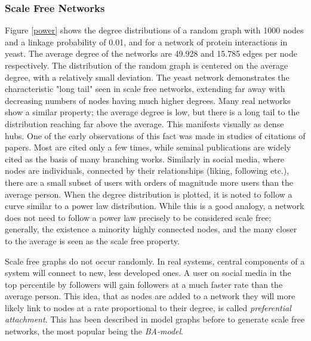 \subsubsection{Scale Free Networks}

Figure \ref{power} shows the degree distributions of a random graph with 1000 nodes and a linkage probability of 0.01, and for a network of protein interactions in yeast. The average degree of the networks are 49.928 and 15.785 edges per node respectively. The distribution of the random graph is centered on the average degree, with a relatively small deviation. The yeast network demonstrates the characteristic "long tail" seen in scale free networks, extending far away with decreasing numbers of nodes having much higher degrees. Many real networks show a similar property; the average degree is low, but there is a long tail to the distribution reaching far above the average. This manifests visually as dense hubs. One of the early observations of this fact was made in studies of citations of papers. Most are cited only a few times, while seminal publications are widely cited as the basis of many branching works. Similarly in social media, where nodes are individuals, connected by their relationships (liking, following etc.), there are a small subset of users with orders of magnitude more users than the average person. When the degree distribution is plotted, it is noted to follow a curve similar to a power law distribution. While this is a good analogy, a network does not need to follow a power law precisely to be considered scale free; generally, the existence a minority highly connected nodes, and the many closer to the average is seen as the scale free property. 

Scale free graphs do not occur randomly. In real systems, central components of a system will connect to new, less developed ones. A user on social media in the top percentile by followers will gain followers at a much faster rate than the average person. This idea, that as nodes are added to a network they will more likely link to nodes at a rate proportional to their degree, is called \textit{preferential attachment}. This has been described in model graphs before to generate scale free networks, the most popular being the \textit{BA-model}\cite{RevModPhys7447}.


